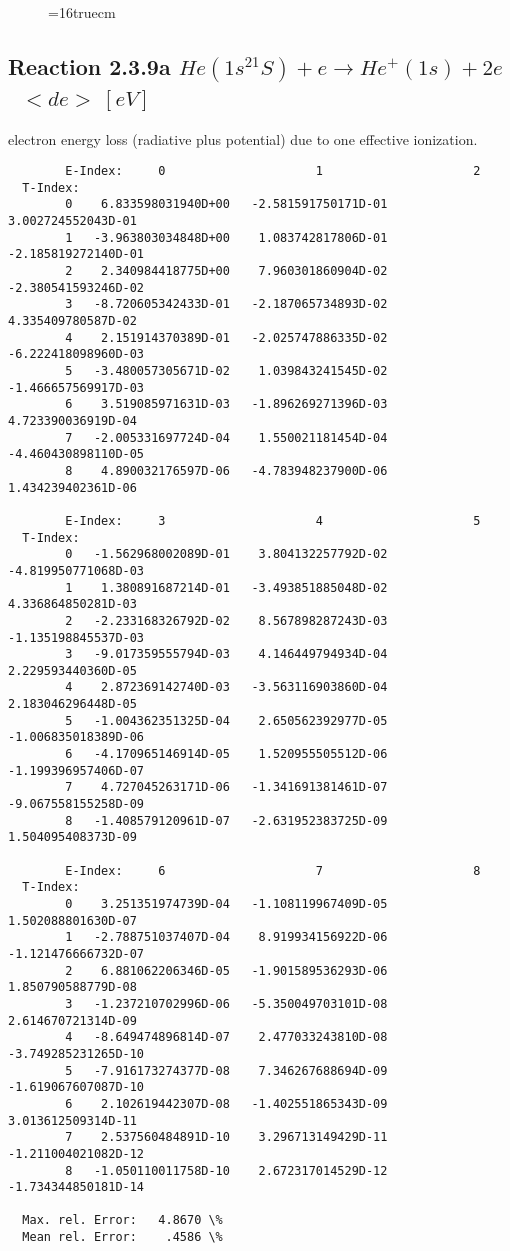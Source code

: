 \documentclass[12pt,dvipdfmx]{article}
\begin{document}
\begin{figure} \label{2.3.2e}
\epsfxsize=16truecm
\end{figure}
\newpage

\subsection{
  Reaction 2.3.9a  $He(1s^21S) + e \rightarrow He^+(1s) + 2e $  \ $ <de> \ [eV] $
}

  electron energy loss (radiative plus potential) due to one effective ionization.

\begin{small}\begin{verbatim}
        E-Index:     0                     1                     2
  T-Index:
        0    6.833598031940D+00   -2.581591750171D-01    3.002724552043D-01
        1   -3.963803034848D+00    1.083742817806D-01   -2.185819272140D-01
        2    2.340984418775D+00    7.960301860904D-02   -2.380541593246D-02
        3   -8.720605342433D-01   -2.187065734893D-02    4.335409780587D-02
        4    2.151914370389D-01   -2.025747886335D-02   -6.222418098960D-03
        5   -3.480057305671D-02    1.039843241545D-02   -1.466657569917D-03
        6    3.519085971631D-03   -1.896269271396D-03    4.723390036919D-04
        7   -2.005331697724D-04    1.550021181454D-04   -4.460430898110D-05
        8    4.890032176597D-06   -4.783948237900D-06    1.434239402361D-06

        E-Index:     3                     4                     5
  T-Index:
        0   -1.562968002089D-01    3.804132257792D-02   -4.819950771068D-03
        1    1.380891687214D-01   -3.493851885048D-02    4.336864850281D-03
        2   -2.233168326792D-02    8.567898287243D-03   -1.135198845537D-03
        3   -9.017359555794D-03    4.146449794934D-04    2.229593440360D-05
        4    2.872369142740D-03   -3.563116903860D-04    2.183046296448D-05
        5   -1.004362351325D-04    2.650562392977D-05   -1.006835018389D-06
        6   -4.170965146914D-05    1.520955505512D-06   -1.199396957406D-07
        7    4.727045263171D-06   -1.341691381461D-07   -9.067558155258D-09
        8   -1.408579120961D-07   -2.631952383725D-09    1.504095408373D-09

        E-Index:     6                     7                     8
  T-Index:
        0    3.251351974739D-04   -1.108119967409D-05    1.502088801630D-07
        1   -2.788751037407D-04    8.919934156922D-06   -1.121476666732D-07
        2    6.881062206346D-05   -1.901589536293D-06    1.850790588779D-08
        3   -1.237210702996D-06   -5.350049703101D-08    2.614670721314D-09
        4   -8.649474896814D-07    2.477033243810D-08   -3.749285231265D-10
        5   -7.916173274377D-08    7.346267688694D-09   -1.619067607087D-10
        6    2.102619442307D-08   -1.402551865343D-09    3.013612509314D-11
        7    2.537560484891D-10    3.296713149429D-11   -1.211004021082D-12
        8   -1.050110011758D-10    2.672317014529D-12   -1.734344850181D-14

  Max. rel. Error:   4.8670 \%
  Mean rel. Error:    .4586 \%

\end{verbatim}\end{small}
\end{document}
